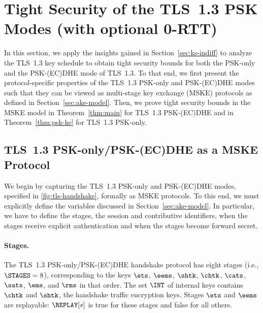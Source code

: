 

\section{Tight Security of the TLS~1.3 PSK Modes
	 (with optional 0-RTT)}
\label{sec:ke-proof}

In this section, we apply the insights gained in Section~\ref{sec:ks-indiff} to analyze the TLS~1.3 key schedule to obtain tight security bounds for both the PSK-only and the PSK-(EC)DHE mode of TLS~1.3. 
To that end, we first present the protocol-specific properties of the TLS~1.3 PSK-only and PSK-(EC)DHE modes such that they can be viewed as multi-stage key exchange (MSKE) protocols as defined in Section~\ref{sec:ake-model}.
Then, we prove tight security bounds in the MSKE model in Theorem~\ref{thm:main} for TLS~1.3 PSK-(EC)DHE and in Theorem~\ref{thm:psk-ke} for TLS~1.3 PSK-only.

\subsection{TLS~1.3 PSK-only/PSK-(EC)DHE as a MSKE Protocol}
\label{sec:tls-formal-def}

We begin by capturing the TLS~1.3 PSK-only and PSK-(EC)DHE modes, specified in \autoref{fig:tls-handshake}, formally as MSKE protocols.
To this end, we must explicitly define the variables discussed in Section~\ref{sec:ake-model}.
In particular, we have to define the stages, the session and contributive identifiers, when the stages receive explicit authentication and when the stages become forward secret.

\paragraph{Stages.}
The TLS~1.3 PSK-only/PSK-(EC)DHE handshake protocol has eight stages (i.e., $\STAGES = 8$), corresponding to the keys $\ets$, $\eems$, $\shtk$, $\chtk$, $\cats$, $\sats$, $\ems$, and $\rms$ in that order.
The set $\INT$ of internal keys contains $\chtk$ and $\shtk$, the handshake traffic encryption keys. 
Stages $\ets$ and $\eems$ are replayable: $\REPLAY[s]$ is true for these stages and false for all others.

